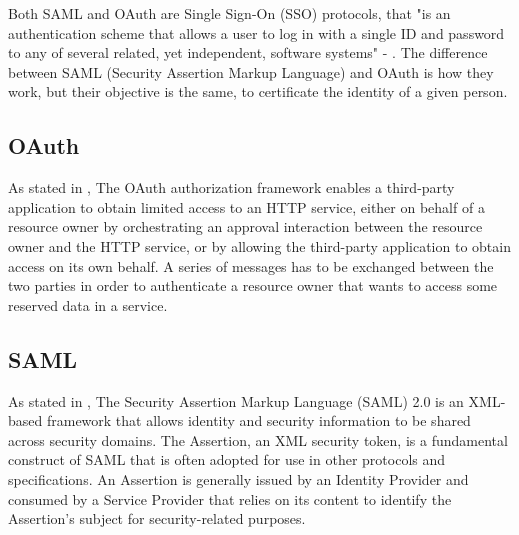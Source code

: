Both SAML and OAuth are Single Sign-On (SSO) protocols, that "is an authentication scheme that allows a user to log in with a single ID and password to any of several related, yet independent, software systems" - \cite{wikipedia_sso}. 
The difference between SAML (Security Assertion Markup Language) and OAuth is how they work, but their objective is the same, to certificate the identity of a given person.

\subsection{OAuth}
As stated in \cite{ietf_oauth2}, The OAuth authorization framework enables a third-party application to obtain limited access to an HTTP service, either on behalf of a resource owner by orchestrating an approval interaction between the resource owner and the HTTP service, or by allowing the third-party application to obtain access on its own behalf.
A series of messages has to be exchanged between the two parties in order to authenticate a resource owner that wants to access some reserved data in a service.

\subsection{SAML}
As stated in \cite{ietf_SAML}, The Security Assertion Markup Language (SAML) 2.0 is an XML-based framework that allows identity and security information to be shared across security domains. The Assertion, an XML security token, is a fundamental construct of SAML that is often adopted for use in other protocols and specifications. An Assertion is generally issued by an Identity Provider and consumed by a Service Provider that relies on its content to identify the Assertion's subject for security-related purposes.





